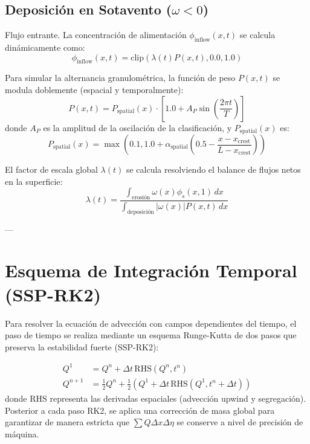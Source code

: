 \documentclass[11pt,a4paper]{article}
\begin{document}
\subsection{Deposición en Sotavento (\(\omega < 0\))}
Flujo entrante. La concentración de alimentación $\phi_{\text{inflow}}(x, t)$ se calcula dinámicamente como:
\begin{equation}
\phi_{\text{inflow}}(x, t) = \text{clip}(\lambda(t) P(x, t), 0.0, 1.0)
\end{equation}

Para simular la alternancia granulométrica, la función de peso $P(x, t)$ se modula doblemente (espacial y temporalmente):
\begin{equation}
P(x, t) = P_{\text{spatial}}(x) \cdot \left[ 1.0 + A_P \sin\left(\frac{2\pi t}{T}\right) \right]
\end{equation}
donde $A_P$ es la amplitud de la oscilación de la clasificación, y $P_{\text{spatial}}(x)$ es:
\begin{equation}
P_{\text{spatial}}(x) = \max\left(0.1, 1.0 + \alpha_{\text{spatial}} \left( 0.5 - \frac{x - x_{\text{crest}}}{L - x_{\text{crest}}} \right)\right)
\end{equation}

El factor de escala global $\lambda(t)$ se calcula resolviendo el balance de flujos netos en la superficie:
\begin{equation}
\lambda(t) = \frac{\int_{\text{erosión}} \omega(x) \phi_s(x, 1) \, dx}{\int_{\text{deposición}} |\omega(x)| P(x, t) \, dx}
\end{equation}

---

\section{Esquema de Integración Temporal (SSP-RK2)}
Para resolver la ecuación de advección con campos dependientes del tiempo, el paso de tiempo se realiza mediante un esquema Runge-Kutta de dos pasos que preserva la estabilidad fuerte (SSP-RK2):

\begin{align}
Q^1 &= Q^n + \Delta t \, \text{RHS}(Q^n, t^n) \\
Q^{n+1} &= \frac{1}{2} Q^n + \frac{1}{2} \left( Q^1 + \Delta t \, \text{RHS}(Q^1, t^n + \Delta t) \right)
\end{align}
donde $\text{RHS}$ representa las derivadas espaciales (advección upwind y segregación). Posterior a cada paso RK2, se aplica una corrección de masa global para garantizar de manera estricta que $\sum Q \Delta x \Delta \eta$ se conserve a nivel de precisión de máquina.
\end{document}
